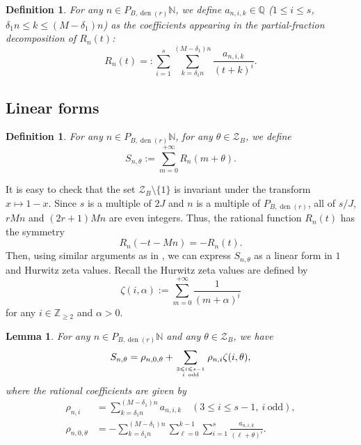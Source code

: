 \documentclass[12pt]{article}
\newtheorem{lemma}[theorem]{Lemma}
\newtheorem{definition}[theorem]{Definition}
\numberwithin{equation}{section}
\begin{document}
\begin{definition}
For any $n \in P_{B,\operatorname{den}(r)}\mathbb{N}$, we define $a_{n,i,k} \in \mathbb{Q}$ ($1 \leqslant i \leqslant s$, $\delta_1 n \leqslant k \leqslant (M-\delta_1)n$) as the coefficients appearing in the partial-fraction decomposition of $R_n(t)$:
\begin{equation}\label{def_a_i_k}
	R_n(t) =: \sum_{i=1}^{s} \sum_{k= \delta_1n}^{(M-\delta_1)n} \frac{a_{n,i,k}}{(t+k)^i}.
\end{equation}
\end{definition}


\subsection{Linear forms}

\begin{definition}
For any $n \in P_{B,\operatorname{den}(r)}\mathbb{N}$, for any $\theta \in \mathcal{Z}_B$, we define 
\begin{equation}\label{def_S_n_theta}
	S_{n,\theta} := \sum_{m=0}^{+\infty} R_n(m+\theta).
\end{equation}
\end{definition}

It is easy to check that the set $\mathcal{Z}_{B} \setminus \{ 1 \}$ is invariant under the transform $x \mapsto 1-x$. Since $s$ is a multiple of $2J$ and $n$ is a multiple of $P_{B,\operatorname{den}(r)}$, all of $s/J$, $rMn$ and $(2r+1)Mn$ are even integers. Thus, the rational function $R_n(t)$ has the symmetry 
\[ R_n(-t-Mn) = - R_n(t). \] 
Then, using similar arguments as in \cite[Lem. 1]{FSZ2019}, we can express $S_{n,\theta}$ as a linear form in $1$ and Hurwitz zeta values. Recall the Hurwitz zeta values are defined by
\[ \zeta(i,\alpha) := \sum_{m=0}^{+\infty} \frac{1}{(m+\alpha)^i} \]
for any $i \in \mathbb{Z}_{\geqslant 2}$ and $\alpha > 0$.

\begin{lemma}\label{lem_lin}
For any $n \in P_{B,\operatorname{den}(r)}\mathbb{N}$ and any $\theta \in \mathcal{Z}_B$, we have
\[ S_{n,\theta} = \rho_{n,0,\theta} + \sum_{3 \leqslant i \leqslant s-1 \atop i~\text{odd} } \rho_{n,i} \zeta(i,\theta), \]
where the rational coefficients are given by
\begin{align}
\rho_{n,i} &= \sum_{k=\delta_1 n}^{(M-\delta_1)n} a_{n,i,k} \quad (3 \leqslant i \leqslant s-1,~i~\text{odd}), \label{def_rho_i} \\
\rho_{n,0,\theta} &= - \sum_{k=\delta_1 n}^{(M-\delta_1)n}\sum_{\ell= 0}^{k-1}\sum_{i=1}^{s} \frac{a_{n,i,k}}{(\ell+\theta)^i}. \label{def_rho_0_theta}
\end{align}
\end{lemma}
\end{document}
